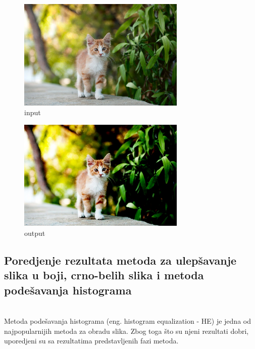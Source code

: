 \documentclass[12pt,a4paper]{article}
\theoremstyle{definition}
\theoremstyle{remark}
\theoremstyle{plain}
\begin{document}
\begin{multicols}{2}
\begin{figure}[H]
\centering
\includegraphics[width=8cm]{images/cat.jpg}
  \caption{input}\label{river}
\end{figure}
\columnbreak
\begin{figure}[H]
\centering
\includegraphics[width=8cm]{images/fuzzy_color_5.jpg}
  \caption{output}\label{cat_output}
\end{figure}
\end{multicols}

\newpage
\subsection{Poredjenje rezultata metoda za ulep\v savanje slika u boji, crno-belih slika i metoda pode\v savanja histograma}
\\
Metoda pode\v savanja histograma (eng. histogram equalization - HE) je jedna od najpopularnijih metoda za obradu slika. 
Zbog toga \v sto su njeni rezultati dobri, uporedjeni su sa rezultatima predstavljenih fazi metoda. \\  
\end{document}
